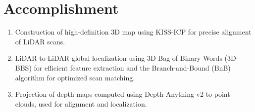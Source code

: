 \section{Accomplishment}
\label{sec:accomplishment}

\begin{enumerate}

\item Construction of high-definition 3D map using KISS-ICP for precise alignment of LiDAR scans.

\item LiDAR-to-LiDAR global localization using 3D Bag of Binary Words (3D-BBS) for efficient feature extraction and the Branch-and-Bound (BnB) algorithm for optimized scan matching.

\item Projection of depth maps computed using Depth Anything v2 to point clouds, used for alignment and localization.

\end{enumerate}
